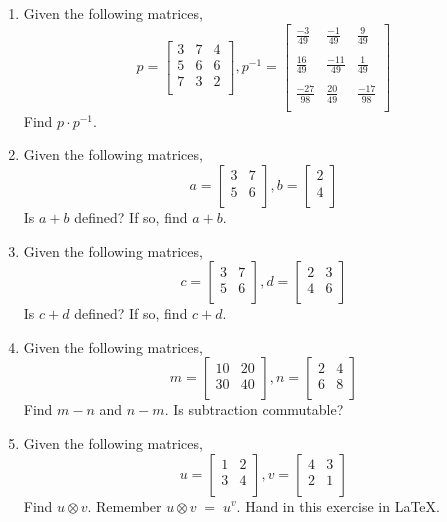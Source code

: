 \documentclass[10pt]{article}
\begin{document}
\begin{enumerate}
\item Given the following matrices,
\[p=
\begin{bmatrix}
3 & 7 & 4\\
5 & 6 & 6\\ 
7 & 3 & 2\\
\end{bmatrix},
p^{-1}=
\begin{bmatrix}
\frac{-3}{49} & \frac{-1}{49}	& \frac{9}{49}\\
\\
\frac{16}{49} & \frac{-11}{49}	& \frac{1}{49}\\
\\
\frac{-27}{98} & \frac{20}{49}	& \frac{-17}{98}\\
\end{bmatrix}
\] Find $p\cdot p^{-1}$.
\item Given the following matrices,
\[a=
\begin{bmatrix}
3 & 7\\
5 & 6\\
\end{bmatrix},
b=
\begin{bmatrix}
2\\
4\\ 
\end{bmatrix}
\] Is $a+b$ defined? If so, find $a+b$.
\item Given the following matrices,
\[c=
\begin{bmatrix}
3 & 7\\
5 & 6\\
\end{bmatrix},
d=
\begin{bmatrix}
2 & 3\\
4 & 6\\ 
\end{bmatrix}
\] Is $c+d$ defined? If so, find $c+d$.
\item Given the following matrices,
\[m=
\begin{bmatrix}
10 & 20\\
30 & 40\\
\end{bmatrix},
n=
\begin{bmatrix}
2 & 4\\
6 & 8\\ 
\end{bmatrix}
\] Find $m-n$ and $n-m$. Is subtraction commutable?
\item Given the following matrices,
\[u=
\begin{bmatrix}
1 & 2\\
3 & 4\\ 
\end{bmatrix},
v=
\begin{bmatrix}
4 & 3\\
2 & 1\\ 
\end{bmatrix}
\] Find $u \otimes v$. Remember $u \otimes v \;=\; u^{v}$. Hand in this exercise in \LaTeX.


\end{enumerate}
\end{document}
